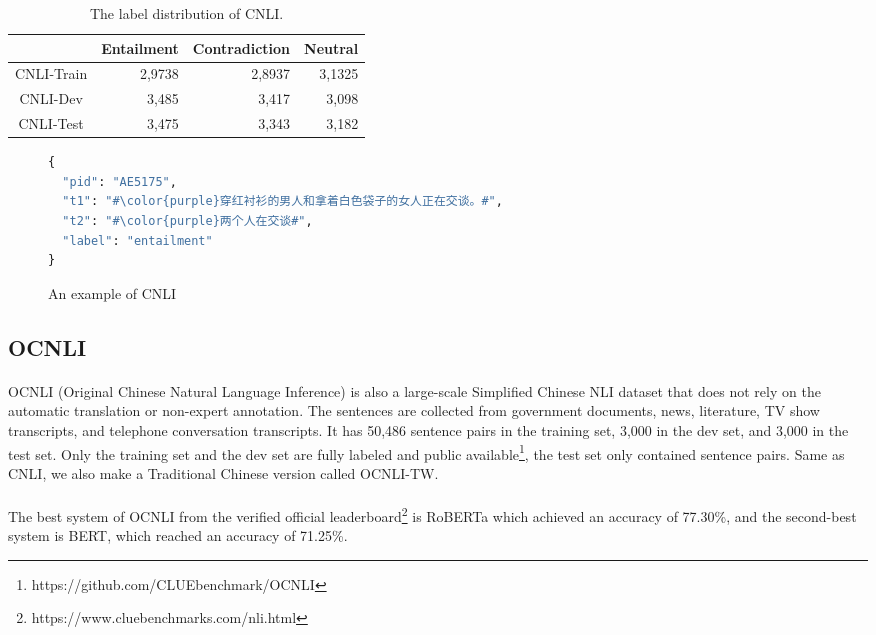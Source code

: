 \documentclass[12pt]{article}
\begin{document}
\begin{CJK*}{UTF8}{bkai}
\begin{spacing}{1.77}
\begin{table}[ht!]
  \centering
  \begin{tabular}{|c|r|r|r|}
  \hline
             & Entailment & Contradiction & Neutral \\ \hline
  CNLI-Train & 2,9738     & 2,8937        & 3,1325  \\ \hline
  CNLI-Dev   & 3,485      & 3,417         & 3,098   \\ \hline
  CNLI-Test  & 3,475      & 3,343         & 3,182   \\ \hline
  \end{tabular}
  \caption{The label distribution of CNLI.}

\end{table}
\begin{figure}
\caption{An example of CNLI}
\begin{CJK*}{UTF8}{gbsn}
\begin{lstlisting}[language=Python, escapechar=\#]
{
  "pid": "AE5175",
  "t1": "#\color{purple}穿红衬衫的男人和拿着白色袋子的女人正在交谈。#",
  "t2": "#\color{purple}两个人在交谈#",
  "label": "entailment"
}
\end{lstlisting}
\end{CJK*}
\end{figure}

\subsection{OCNLI}
\paragraph{}
OCNLI (Original Chinese Natural Language Inference) is also a large-scale Simplified Chinese NLI dataset that does not rely on the automatic translation or non-expert annotation. The sentences are collected from government documents, news, literature, TV show transcripts, and telephone conversation transcripts. It has 50,486 sentence pairs in the training set, 3,000 in the dev set, and 3,000 in the test set. Only the training set and the dev set are fully labeled and public available\footnote{https://github.com/CLUEbenchmark/OCNLI}, the test set only contained sentence pairs. Same as CNLI, we also make a Traditional Chinese version called OCNLI-TW.

\paragraph{}
The best system of OCNLI from the verified official leaderboard\footnote{https://www.cluebenchmarks.com/nli.html} is RoBERTa which achieved an accuracy of 77.30\%, and the second-best system is BERT, which reached an accuracy of 71.25\%.


\end{spacing}
\end{CJK*}
\end{document}

